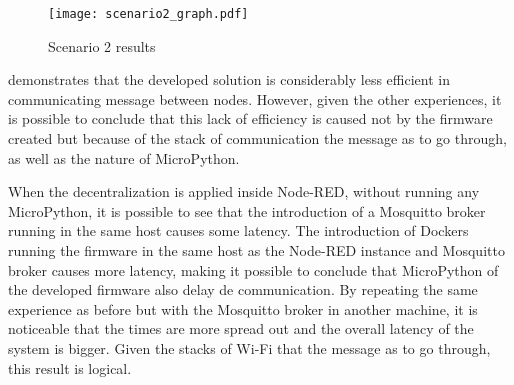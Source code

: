 \captionsetup{belowskip=12pt,aboveskip=4pt}
\begin{table}[ht]
    \centering
    \caption{Scenario 2 results}
    \label{tab:scenario2_table}
\end{table}{}

\begin{figure}[h]
\centering
\texttt{[image: scenario2\_graph.pdf]}
\caption[Scenario 2 results]{Scenario 2 results}\label{fig:scenario2_candlestick}
\end{figure}

 demonstrates that the developed solution is considerably less efficient in communicating message between nodes. However, given the other experiences, it is possible to conclude that this lack of efficiency is caused not by the firmware created but because of the stack of communication the message as to go through, as well as the nature of MicroPython. 

When the decentralization is applied inside Node-RED, without running any MicroPython, it is possible to see that the introduction of a Mosquitto broker running in the same host causes some latency. The introduction of Dockers running the firmware in the same host as the Node-RED instance and Mosquitto broker causes more latency, making it possible to conclude that MicroPython of the developed firmware also delay de communication. By repeating the same experience as before but with the Mosquitto broker in another machine, it is noticeable that the times are more spread out and the overall latency of the system is bigger. Given the stacks of Wi-Fi that the message as to go through, this result is logical.

